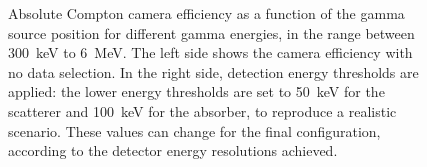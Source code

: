 \begin{figure} [!hbtp]	
\centering
\caption{Absolute Compton camera efficiency as a function of the gamma source position for different gamma energies, in the range between 300~keV to 6~MeV. The left side shows the camera efficiency with no data selection. In the right side, detection energy thresholds are applied: the lower energy thresholds are set to 
50~keV for the scatterer and 100~keV for the absorber, to reproduce a realistic scenario. These values can change for the final configuration, according to the detector energy resolutions achieved.}
\label{fig::efficiency_study}
\end{figure}

